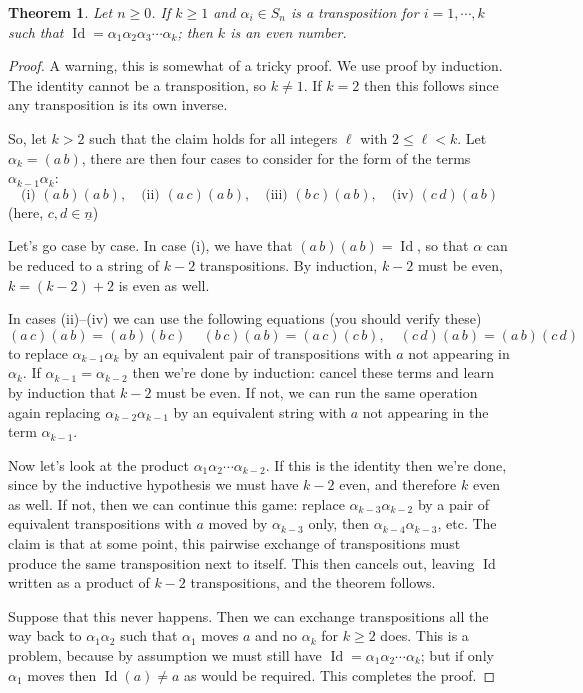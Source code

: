 \documentclass[12pt]{article}
\numberwithin{equation}{subsection}
\newtheorem{thm}[subsection]{Theorem}
\theoremstyle{note}
\newcommand{\Id}{\operatorname{Id}}
\begin{document}
\begin{thm} \label{id-is-even}
	Let $n\geq 0$. If $k\geq 1$ and $\alpha_i\in S_n$ is a transposition for $i=1,\cdots,k$ such that $\Id=\alpha_1\alpha_{2}\alpha_3 \cdots \alpha_k$; then $k$ is an even number.
\end{thm}
\begin{proof}
	A warning, this is somewhat of a tricky proof. We use proof by induction. The identity cannot be a transposition, so $k\neq 1$. If $k=2$ then this follows since any transposition is its own inverse. 
	
	So, let $k>2$ such that the claim holds for all integers $\ell$ with $2\leq \ell < k$. Let $\alpha_k=(a\,b)$, there are then four cases to consider for the form of the terms $\alpha_{k-1}\alpha_k$: \[ \text{(i) } (a \, b)(a\, b),  \quad\text{(ii) } (a \, c)(a\, b) , \quad\text{(iii) } (b \, c)(a\, b) , \quad\text{(iv) } (c \, d)(a\, b)\]
	(here, $c,d\in \underline{n}$)
	
	Let's go case by case. In case (i), we have that $(a\, b)(a\, b)=\Id$, so that $\alpha$ can be reduced to a string of $k-2$ transpositions. By induction, $k-2$ must be even, $k=(k-2)+2$ is even as well. 
	
	In cases (ii)--(iv) we can use the following equations (you should verify these)  \begin{equation} (a\,c)(a\,b)=(a\, b)(b\, c)\, \quad (b\,c)(a\, b)=(a\,c)(c\,b), \quad (c\,d)(a\,b)=(a\,b)(c\,d) \end{equation} to replace $\alpha_{k-1}\alpha_k$ by an equivalent pair of transpositions with $a$ not appearing in $\alpha_k$. If $\alpha_{k-1}=\alpha_{k-2}$ then we're done by induction: cancel these terms and learn by induction that $k-2$ must be even. If not, we can run the same operation again replacing $\alpha_{k-2}\alpha_{k-1}$ by an equivalent string with $a$ not appearing in the term $\alpha_{k-1}$. 
	
	Now let's look at the product $\alpha_1\alpha_2\cdots\alpha_{k-2}$. If this is the identity then we're done, since by the inductive hypothesis we must have $k-2$ even, and therefore $k$ even as well. If not, then we can continue this game: replace $\alpha_{k-3}\alpha_{k-2}$ by a pair of equivalent transpositions with $a$ moved by $\alpha_{k-3}$ only, then $\alpha_{k-4}\alpha_{k-3}$, etc. The claim is that at some point, this pairwise exchange of transpositions must produce the same transposition next to itself. This then cancels out, leaving $\Id$ written as a product of $k-2$ transpositions, and the theorem follows. 
	
	Suppose that this never happens. Then we can exchange transpositions all the way back to $\alpha_1\alpha_2$ such that $\alpha_1$ moves $a$ and no $\alpha_k$ for $k\geq 2$ does. This is a problem, because by assumption we must still have $\Id=\alpha_1\alpha_2\cdots\alpha_k$; but if only $\alpha_1$ moves then $\Id(a)\neq a$ as would be required. This completes the proof.\end{proof} 
\end{document}
